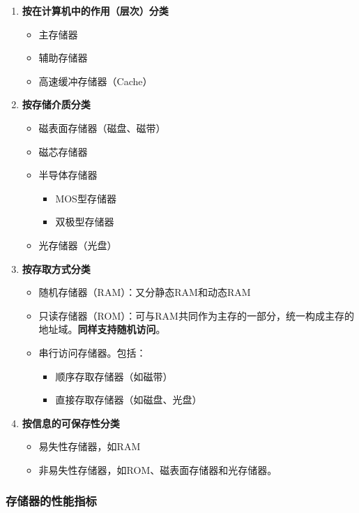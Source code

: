 \documentclass[12pt, a4paper, oneside]{ctexart}
\begin{document}
\begin{enumerate}
  \item {\bf 按在计算机中的作用（层次）分类}
  \begin{itemize}
    \item 主存储器
    \item 辅助存储器
    \item 高速缓冲存储器（Cache）
  \end{itemize}
  \item {\bf 按存储介质分类}
  \begin{itemize}
    \item 磁表面存储器（磁盘、磁带）
    \item 磁芯存储器
    \item 半导体存储器
    \begin{itemize}
      \item MOS型存储器
      \item 双极型存储器
    \end{itemize}
    \item 光存储器（光盘）
  \end{itemize}
  \item {\bf 按存取方式分类}
  \begin{itemize}
    \item 随机存储器（RAM）：又分静态RAM和动态RAM
    \item 只读存储器（ROM）：可与RAM共同作为主存的一部分，统一构成主存的地址域。\textbf{同样支持随机访问}。
    \item 串行访问存储器。包括：
    \begin{itemize}
      \item 顺序存取存储器（如磁带）
      \item 直接存取存储器（如磁盘、光盘）
    \end{itemize}
  \end{itemize}
  \item {\bf 按信息的可保存性分类}
  \begin{itemize}
    \item 易失性存储器，如RAM
    \item 非易失性存储器，如ROM、磁表面存储器和光存储器。
  \end{itemize}
\end{enumerate}

\subsubsection{存储器的性能指标}
\end{document}

